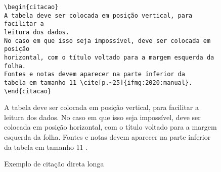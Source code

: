 \begin{figure}[!htb]
\caption{Exemplo de citação direta longa} \label{figura:citacao_direta_longa}
\hrulefill\vspace*{-1em}

\begin{verbatim}
\begin{citacao}
A tabela deve ser colocada em posição vertical, para facilitar a
leitura dos dados.
No caso em que isso seja impossível, deve ser colocada em posição
horizontal, com o título voltado para a margem esquerda da folha.
Fontes e notas devem aparecer na parte inferior da
tabela em tamanho 11 \cite[p.~25]{ifmg:2020:manual}.
\end{citacao}
\end{verbatim}

\vspace*{-1.5em}\hrulefill

\begin{citacao}
A tabela deve ser colocada em posição vertical, para facilitar a leitura dos dados. No
caso em que isso seja impossível, deve ser colocada em posição horizontal, com o título
voltado para a margem esquerda da folha. Fontes e notas devem aparecer na parte inferior da
tabela em tamanho 11 \cite[p.~25]{ifmg:2020:manual}.
\end{citacao}

\vspace*{-0.5em}\hrulefill
{}
\end{figure}
